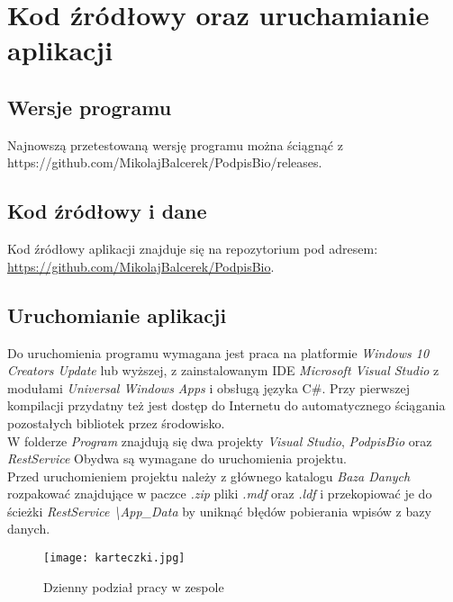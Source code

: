 \documentclass[notitlepage, oneside]{report}
\begin{document}
 \chapter*{Kod źródłowy oraz uruchamianie aplikacji}
  \section*{Wersje programu}
  Najnowszą przetestowaną wersję programu można ściągnąć z {https://github.com/MikolajBalcerek/PodpisBio/releases}.
 \section*{Kod źródłowy i dane}
 Kod źródłowy aplikacji znajduje się na repozytorium pod adresem: \\
 \url{https://github.com/MikolajBalcerek/PodpisBio}. \\
 \section*{Uruchomianie aplikacji}
Do uruchomienia programu wymagana jest praca na platformie \textit{Windows 10 Creators Update} lub wyższej, z zainstalowanym IDE \textit{Microsoft Visual Studio} z modułami \textit{Universal Windows Apps} i obsługą języka C\#. Przy pierwszej kompilacji przydatny też jest dostęp do Internetu do automatycznego ściągania pozostałych bibliotek przez środowisko. \\
    W folderze \textit{Program} znajdują się dwa projekty \textit{Visual Studio}, \textit{PodpisBio} oraz \textit{RestService}
 Obydwa są wymagane do uruchomienia projektu. \\ Przed uruchomieniem projektu należy z głównego katalogu \textit{Baza Danych} rozpakować znajdujące w paczce \textit{.zip} pliki \textit{.mdf} oraz \textit{.ldf} i przekopiować je do ścieżki \textit{RestService \textbackslash App\_Data} by uniknąć błędów pobierania wpisów z bazy danych.
  
 
 
 
 

\begin{figure}
\centering
\texttt{[image: karteczki.jpg]}
\caption{Dzienny podział pracy w zespole}
\label{rys:karteczki}
\end{figure}
\end{document}
